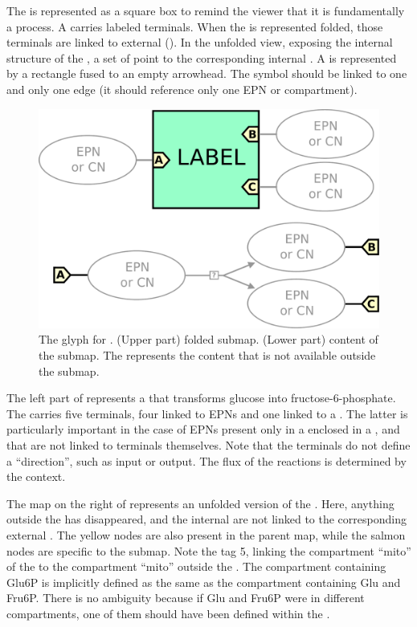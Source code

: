 The  is represented as a square box to remind the viewer that it is fundamentally a process. A  carries labeled terminals.  When the  is represented folded, those terminals are linked to external  ().  In the unfolded view, exposing the internal structure of the , a set of  point to the corresponding internal  . A  is represented by a rectangle fused to an empty arrowhead. The symbol should be linked to one and only one edge (\ie it should reference only one EPN or compartment).

\begin{figure}[htb]
  \centering
  \includegraphics[scale = 0.22]{le_images/submap}
  \caption{The \PD glyph for . (Upper part) folded submap. (Lower part) content of the submap. The  represents the content that is not available outside the submap.}
  \label{fig:submap}
\end{figure}

The left part of  represents a  that transforms glucose into fructose-6-phosphate. The  carries five terminals, four linked to EPNs and one linked to a .  The latter is particularly important in the case of EPNs present only in a  enclosed in a , and that are not linked to terminals themselves.  Note that the terminals do not define a ``direction'', such as input or output.  The flux of the reactions is determined by the context.

The map on the right of  represents an unfolded version of the .  Here, anything outside the  has disappeared, and the internal  are not linked to the corresponding external . The yellow nodes are also present in the parent map, while the salmon nodes are specific to the submap. Note the tag 5, linking the compartment ``mito'' of the  to the compartment ``mito'' outside the .  The compartment containing Glu6P is implicitly defined as the same as the compartment containing Glu and Fru6P.  There is no ambiguity because if Glu and Fru6P were in different compartments, one of them should have been defined within the .

